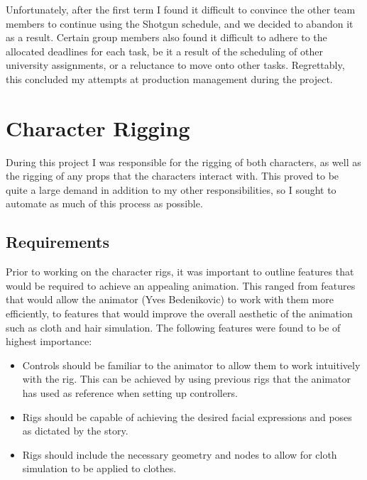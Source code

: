 \documentclass[11pt]{article}
\begin{document}
Unfortunately, after the first term I found it difficult to convince the other team members to continue using the Shotgun schedule, and we decided to abandon it as a result. Certain group members also found it difficult to adhere to the allocated deadlines for each task, be it a result of the scheduling of other university assignments, or a reluctance to move onto other tasks. Regrettably, this concluded my attempts at production management during the project.

\section{Character Rigging}

During this project I was responsible for the rigging of both characters, as well as the rigging of any props that the characters interact with. This proved to be quite a large demand in addition to my other responsibilities, so I sought to automate as much of this process as possible.

\subsection{Requirements}

Prior to working on the character rigs, it was important to outline features that would be required to achieve an appealing animation. This ranged from features that would allow the animator (Yves Bedenikovic) to work with them more efficiently, to features that would improve the overall aesthetic of the animation such as cloth and hair simulation. The following features were found to be of highest importance:

\begin{itemize}

\item Controls should be familiar to the animator to allow them to work intuitively with the rig. This can be achieved by using previous rigs that the animator has used as reference when setting up controllers.

\item Rigs should be capable of achieving the desired facial expressions and poses as dictated by the story.

\item Rigs should include the necessary geometry and nodes to allow for cloth simulation to be applied to clothes.

\end{itemize}
\end{document}
